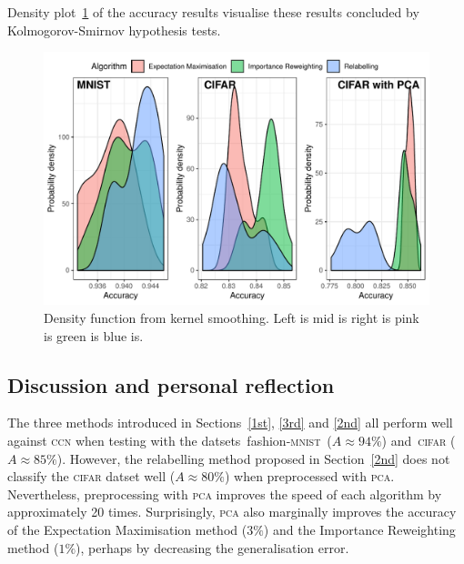 \documentclass[12pt]{article} %
\newcommand{\mnist}{fashion-\textsc{mnist}\ }
\begin{document}
Density plot~\ref{fig:Density} of the accuracy results visualise these results concluded by Kolmogorov-Smirnov hypothesis tests.
\begin{figure}
    \centering
	\includegraphics[scale=0.8]{histo}
	\caption{Density function from kernel smoothing. Left is mid is right is pink is green is blue is.}
	\label{fig:Density}
\end{figure}




\subsection{Discussion and personal reflection}




The three methods introduced in Sections~\ref{1st}, \ref{3rd} and \ref{2nd}  all perform well against \textsc{ccn} when testing with the datsets~\mnist ($A\approx 94\%$) and~\textsc{cifar} ($A\approx 85\%$). However, the relabelling method proposed in Section~\ref{2nd} does not classify the \textsc{cifar} datset well ($A\approx 80\%$) when preprocessed with \textsc{pca}. Nevertheless, preprocessing with \textsc{pca} improves the speed of each algorithm by approximately 20 times. Surprisingly, \textsc{pca} also marginally improves the accuracy of the Expectation Maximisation method ($3\%$) and the Importance Reweighting method ($1\%$), perhaps by decreasing the generalisation error.
\end{document}
